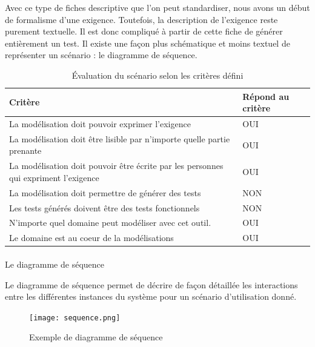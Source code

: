         Avec ce type de fiches descriptive que l'on peut standardiser, nous avons un début de formalisme d'une exigence. Toutefois, la description de l'exigence reste purement textuelle. Il est donc compliqué à partir de cette fiche de générer entièrement un test. Il existe une façon plus schématique et moins textuel de représenter un scénario : le diagramme de séquence.
        \begin{table}[H]
        \centering
         \begin{tabular}{|p{25em}|p{5em}|} 
         \hline
        Critère & Répond au critère \\ [0.5ex] 
         \hline
         La modélisation doit pouvoir exprimer l’exigence & \cellcolor[HTML]{699A73}OUI\\
         \hline
        La modélisation doit être lisible par n’importe quelle partie prenante & \cellcolor[HTML]{699A73}OUI\\
         \hline
        La modélisation doit pouvoir être écrite par les personnes qui expriment l’exigence &\cellcolor[HTML]{699A73} OUI \\
         \hline
        La modélisation doit permettre de générer des tests & \cellcolor[HTML]{D03737}NON \\
         \hline
        Les tests générés doivent être des tests fonctionnels &\cellcolor[HTML]{D03737} NON\\ 
         \hline
        N’importe quel domaine peut modéliser avec cet outil.&\cellcolor[HTML]{699A73} OUI\\ 
         \hline
        Le domaine est au coeur de la modélisations &\cellcolor[HTML]{699A73} OUI\\ 
        \hline 
        \end{tabular}
        \caption{Évaluation du scénario selon les critères défini}
        \end{table}
    
        \paragraph{}{Le diagramme de séquence}

        Le diagramme de séquence permet de décrire de façon détaillée les interactions entre les différentes instances du système pour un scénario d'utilisation donné. 
        
            \begin{figure}[H]
                \centering
                \texttt{[image: sequence.png]}
                \caption{Exemple de diagramme de séquence}
            \end{figure}
        
